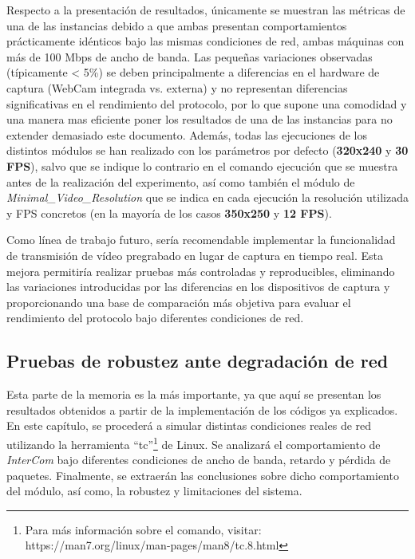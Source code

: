 Respecto a la presentación de resultados, únicamente se muestran las métricas de una de las instancias debido a que ambas presentan comportamientos prácticamente idénticos bajo las mismas condiciones de red, ambas máquinas con más de 100 Mbps de ancho de banda. Las pequeñas variaciones observadas (típicamente < 5\%) se deben principalmente a diferencias en el hardware de captura (WebCam integrada vs. externa) y no representan diferencias significativas en el rendimiento del protocolo, por lo que supone una comodidad y una manera mas eficiente poner los resultados de una de las instancias para no extender demasiado este documento. Además, todas las ejecuciones de los distintos módulos se han realizado con los parámetros por defecto (\textbf{320x240} y \textbf{30 FPS}), salvo que se indique lo contrario en el comando ejecución que se muestra antes de la realización del experimento, así como también el módulo de \textit{Minimal\_Video\_Resolution} que se indica en cada ejecución la resolución utilizada y FPS concretos (en la mayoría de los casos \textbf{350x250} y \textbf{12 FPS}).
\vspace{\baselineskip}

Como línea de trabajo futuro, sería recomendable implementar la funcionalidad de transmisión de vídeo pregrabado en lugar de captura en tiempo real. Esta mejora permitiría realizar pruebas más controladas y reproducibles, eliminando las variaciones introducidas por las diferencias en los dispositivos de captura y proporcionando una base de comparación más objetiva para evaluar el rendimiento del protocolo bajo diferentes condiciones de red. 


\subsection{Pruebas de robustez ante degradación de red}

Esta parte de la memoria es la más importante, ya que aquí se presentan los resultados obtenidos a partir de la implementación de los códigos ya explicados. En este capítulo, se procederá a simular distintas condiciones reales de red utilizando la herramienta ``tc''\footnote{Para más información sobre el comando, visitar: https://man7.org/linux/man-pages/man8/tc.8.html} de Linux. Se analizará el comportamiento de \textit{InterCom} bajo diferentes condiciones de ancho de banda, retardo y pérdida de paquetes. Finalmente, se extraerán las conclusiones sobre dicho comportamiento del módulo, así como, la robustez y limitaciones del sistema. 
\vspace{\baselineskip}

